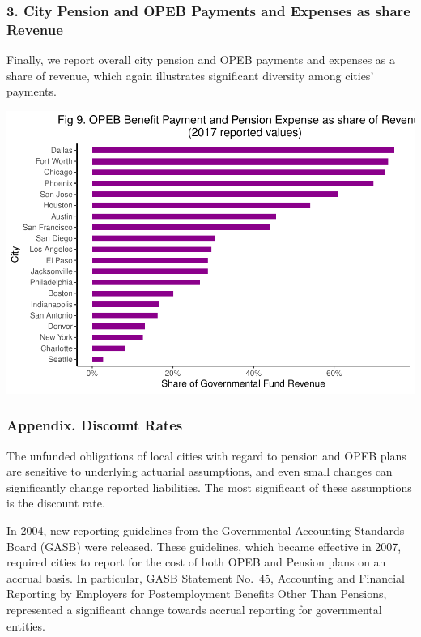 \documentclass[
]{article}
\begin{document}
\hypertarget{city-pension-and-opeb-payments-and-expenses-as-share-revenue}{%
\subsubsection{3. City Pension and OPEB Payments and Expenses as share
Revenue}\label{city-pension-and-opeb-payments-and-expenses-as-share-revenue}}

Finally, we report overall city pension and OPEB payments and expenses
as a share of revenue, which again illustrates significant diversity
among cities' payments.

\includegraphics{City-Solvency-Report--Adjusted-_files/figure-latex/unnamed-chunk-14-1.pdf}

\hypertarget{appendix.-discount-rates}{%
\subsubsection{Appendix. Discount
Rates}\label{appendix.-discount-rates}}

The unfunded obligations of local cities with regard to pension and OPEB
plans are sensitive to underlying actuarial assumptions, and even small
changes can significantly change reported liabilities. The most
significant of these assumptions is the discount rate.

In 2004, new reporting guidelines from the Governmental Accounting
Standards Board (GASB) were released. These guidelines, which became
effective in 2007, required cities to report for the cost of both OPEB
and Pension plans on an accrual basis. In particular, GASB Statement
No.~45, Accounting and Financial Reporting by Employers for
Postemployment Benefits Other Than Pensions, represented a significant
change towards accrual reporting for governmental entities.
\end{document}
